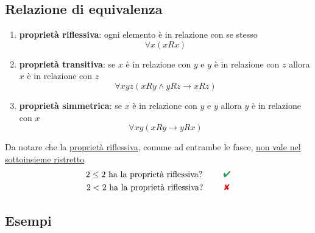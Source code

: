 \documentclass[italian]{article}
\newcommand{\crossmark}{\textcolor{red}{\text{$\qquad$\ding{56}}}}
\renewcommand{\checkmark}{\textcolor{ForestGreen}{\text{$\qquad$\ding{52}}}}
\begin{document}
\subsection{Relazione di equivalenza}
\begin{enumerate}
	\item \textbf{proprietà riflessiva}: ogni elemento è in relazione con se stesso
		\[
			\forall x(xRx)
		\]
	\item \textbf{proprietà transitiva}: se $x$ è in relazione con $y$ e $y$ è in relazione con $z$ allora $x$ è in relazione con $z$
		\[
			\forall xyz (xRy \land yRz \to xRz)
		\]  
	\item \textbf{proprietà simmetrica}: se $x$ è in relazione con $y$ e $y$ allora $y$ è in relazione con $x$
		\[
			\forall xy (xRy \to yRx)
		\]
\end{enumerate}
Da notare che la \underline{proprietà riflessiva}, comune ad entrambe le fasce,  \underline{non vale nel sottoinsieme ristretto}
\begin{gather*}
	2 \leq 2 \text{ ha la proprietà riflessiva? } \checkmark\\
	2 < 2 \text{ ha la proprietà riflessiva? } \crossmark
\end{gather*}


\newpage
\subsection{Esempi}
\end{document}
